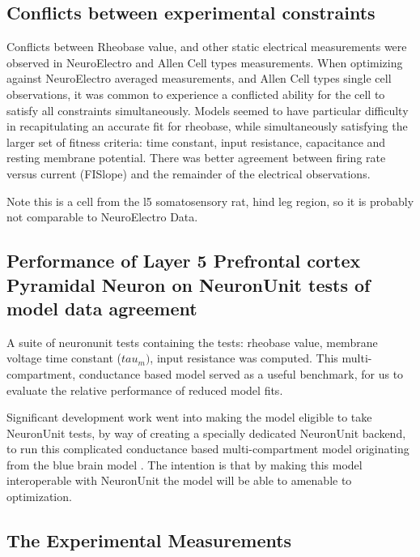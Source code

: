 \subsection{Conflicts between experimental constraints}

Conflicts between Rheobase value, and other static electrical measurements were observed in NeuroElectro and Allen Cell types measurements. When optimizing against NeuroElectro averaged measurements, and Allen Cell types single cell observations, it was common to experience a conflicted ability for the cell to satisfy all constraints simultaneously. 
Models seemed to have particular difficulty in recapitulating an accurate fit for rheobase, while simultaneously satisfying the larger set of fitness criteria: time constant, input resistance, capacitance and resting membrane potential. There was better agreement between firing rate versus current (FISlope) and the remainder of the electrical observations.

%
Note this is a cell from the l5 somatosensory rat, hind leg region, so it is probably not comparable to NeuroElectro Data.
\subsection{Performance of Layer 5 Prefrontal cortex Pyramidal Neuron on NeuronUnit tests of model data agreement}
\cite{van2016bluepyopt}
A suite of neuronunit tests containing the tests: rheobase value, membrane voltage time constant ($tau_{m})$, input resistance was computed. This multi-compartment, conductance based model served as a useful benchmark, for us to evaluate the relative performance of reduced model fits.

Significant development work went into making the model eligible to take NeuronUnit tests, by way of creating a specially dedicated NeuronUnit backend, to run this complicated conductance based multi-compartment model originating from the blue brain model \cite{markram2015reconstruction}. The intention is that by making this model interoperable with NeuronUnit the model will be able to amenable to optimization.


\subsection{The Experimental Measurements}

